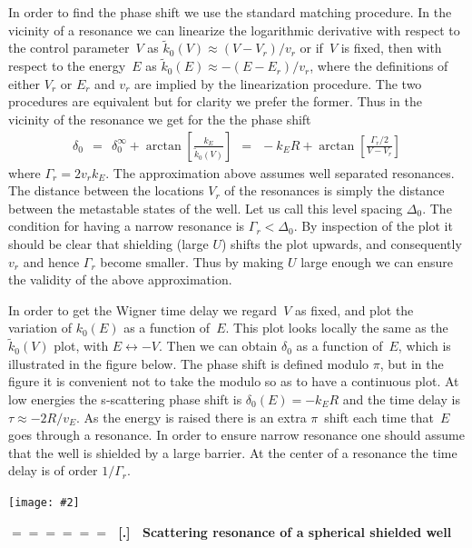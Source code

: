\documentclass[onecolumn,fleqn]{revtex4}
\newcommand{\putgraph}[2][0.30\hsize]{\texttt{[image: \#2]}}
\newcommand{\beq}{\begin{eqnarray}}
\newcommand{\eeq}{\end{eqnarray}}
\renewcommand{\thesubsection}{\arabic{subsection}}
\renewcommand{\thesubsubsection}{\arabic{subsubsection}}
\newcommand{\sheadC}[1]
{
\addtocounter{subsubsection}{1}
\vspace{5mm}
{\Large\bf $=\!=\!=\!=\!=\!=\;$ [\thesubsection.\thesubsubsection] \ #1}  
\nopagebreak
\phantomsection
}
\begin{document}
In order to find the phase shift we use the standard 
matching procedure. In the vicinity of a resonance 
we can linearize the logarithmic derivative 
with respect to the control parameter~$V$ 
as ${\tilde{k}_0(V) \approx (V-V_r)/v_r}$
or if~$V$ is fixed, then with respect to the energy~$E$ 
as ${\tilde{k}_0(E) \approx -(E-E_r)/v_r}$, 
where the definitions of either $V_r$ or $E_r$ and $v_r$ are implied 
by the linearization procedure.
The two procedures are equivalent 
but for clarity we prefer the former.      
Thus in the vicinity of the resonance 
we get for the the phase shift
\beq
\delta_{0} \ \ = \ \ 
\delta_{0}^{\infty} + \arctan\left[ \frac{k_E}{\tilde{k}_0(V)}  \right]
\ \ = \ \ 
-k_E R + \arctan\left[\frac{\Gamma_r/2}{V-V_r}\right]
\eeq
where $\Gamma_r = 2 v_r k_E$.
The approximation above assumes 
well separated resonances.   
The distance between 
the locations $V_r$ of the resonances   
is simply the distance between the 
metastable states of the well. 
Let us call this level spacing $\Delta_0$. 
The condition for having a narrow resonance 
is $\Gamma_r < \Delta_0$. 
By inspection of the plot it should be clear 
that shielding (large $U$) shifts 
the plot upwards, and consequently $v_r$ 
and hence $\Gamma_r$ become smaller. 
Thus by making $U$ large enough we can 
ensure the validity of the above approximation.


In order to get the Wigner time delay we  
regard~$V$ as fixed, and plot the variation 
of $k_0(E)$ as a function of~$E$. 
This plot looks locally the same 
as the~$\tilde{k}_0(V)$ plot, with ${E \leftrightarrow -V}$. 
Then we can obtain $\delta_{0}$ as a function of~$E$, 
which is illustrated in the figure below. 
The phase shift is defined modulo $\pi$, 
but in the figure it is convenient 
not to take the modulo so as to have a continuous plot. 
At low energies the s-scattering   
phase shift is ${\delta_0(E)=-k_ER}$ 
and the time delay is $\tau \approx -2R/v_E$.
As the energy is raised there is an extra $\pi$~shift 
each time that~$E$ goes through a resonance. 
In order to ensure narrow resonance one should  
assume that the well is shielded by a large barrier. 
At the center of a resonance the time delay 
is of order $1/\Gamma_r$.  

    
\begin{center}
\putgraph[0.36\hsize]{PhaseShift}
\end{center}







\sheadC{Scattering resonance of a spherical shielded well}
\end{document}
